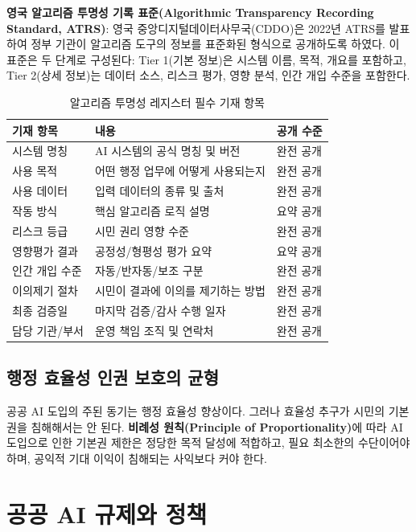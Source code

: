 \textbf{영국 알고리즘 투명성 기록 표준(Algorithmic Transparency Recording Standard, ATRS)}: 영국 중앙디지털데이터사무국(CDDO)은 2022년 ATRS를 발표하여 정부 기관이 알고리즘 도구의 정보를 표준화된 형식으로 공개하도록 하였다. 이 표준은 두 단계로 구성된다: Tier 1(기본 정보)은 시스템 이름, 목적, 개요를 포함하고, Tier 2(상세 정보)는 데이터 소스, 리스크 평가, 영향 분석, 인간 개입 수준을 포함한다.

\begin{table}[htbp]
\centering
\caption{알고리즘 투명성 레지스터 필수 기재 항목}
\label{tab:18_register}
\begin{tabularx}{\textwidth}{p{3cm}Xp{4cm}}
\toprule
\textbf{기재 항목} & \textbf{내용} & \textbf{공개 수준} \\
\midrule
시스템 명칭 & AI 시스템의 공식 명칭 및 버전 & 완전 공개 \\
사용 목적 & 어떤 행정 업무에 어떻게 사용되는지 & 완전 공개 \\
사용 데이터 & 입력 데이터의 종류 및 출처 & 완전 공개 \\
작동 방식 & 핵심 알고리즘 로직 설명 & 요약 공개 \\
리스크 등급 & 시민 권리 영향 수준 & 완전 공개 \\
영향평가 결과 & 공정성/형평성 평가 요약 & 요약 공개 \\
인간 개입 수준 & 자동/반자동/보조 구분 & 완전 공개 \\
이의제기 절차 & 시민이 결과에 이의를 제기하는 방법 & 완전 공개 \\
최종 검증일 & 마지막 검증/감사 수행 일자 & 완전 공개 \\
담당 기관/부서 & 운영 책임 조직 및 연락처 & 완전 공개 \\
\bottomrule
\end{tabularx}
\end{table}

\subsection{행정 효율성 인권 보호의 균형}
\label{sec:18.1.3}

공공 AI 도입의 주된 동기는 행정 효율성 향상이다. 그러나 효율성 추구가 시민의 기본권을 침해해서는 안 된다. \textbf{비례성 원칙(Principle of Proportionality)}에 따라 AI 도입으로 인한 기본권 제한은 정당한 목적 달성에 적합하고, 필요 최소한의 수단이어야 하며, 공익적 기대 이익이 침해되는 사익보다 커야 한다.

\section{공공 AI 규제와 정책}
\label{sec:18.2}

